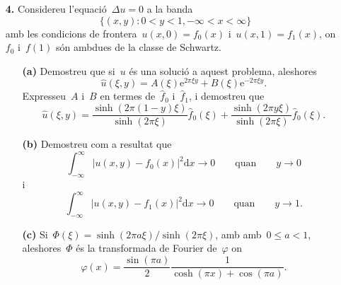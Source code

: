 \documentclass[a4paper]{article}
\theoremstyle{plain}
\theoremstyle{definition}
\newcommand{\e}{\mathrm{e}}
\providecommand{\uppi}{\pi}
\newcommand{\diff}{\mathrm{d}}
\newcommand{\abs}[1]{\lvert{#1}\rvert}
\begin{document}
\begin{enumerate}
    \item[\textbf{4.}] Considereu l'equació~\(\Delta u=0\) a la banda
        \[
            \{(x,y):0<y<1, -\infty<x<\infty\}
        \]
        amb les condicions de frontera~\(u(x,0)=f_{0}(x)\)
        i~\(u(x,1)=f_{1}(x)\), on~\(f_{0}\) i~\(f(1)\) són ambdues de la classe
        de Schwartz.
        \begin{enumerate}
            \item[\textbf{(a)}] Demostreu que si~\(u\) és una solució a aquest
                problema, aleshores
                \[
                    \widehat{u}(\xi,y) =
                    A(\xi)\e^{2\uppi\xi y}
                    +
                    B(\xi)\e^{-2\uppi\xi y}.
                \]
                Expresseu~\(A\) i~\(B\) en termes de~\(\widehat{f}_{0}\)
                i~\(\widehat{f}_{1}\), i demostreu que
                \[
                    \widehat{u}(\xi,y) =
                    \frac{\sinh(2\uppi(1-y)\xi)}{\sinh(2\uppi\xi)}
                    \widehat{f}_{0}(\xi)
                    +
                    \frac{\sinh(2\uppi y\xi)}{\sinh(2\uppi\xi)}
                    \widehat{f}_{0}(\xi).
                \]
        \end{enumerate}
\end{enumerate}

\begin{enumerate}
    \item[]\begin{enumerate}
        \item[\textbf{(b)}] Demostreu com a resultat que
            \[
                \int_{-\infty}^{\infty}
                \abs{u(x,y) - f_{0}(x)}^{2}
                \diff x
                \to 0
                \qquad\text{quan}\qquad
                y\to 0
            \]
            i
            \[
                \int_{-\infty}^{\infty}
                \abs{u(x,y) - f_{1}(x)}^{2}
                \diff x
                \to 0
                \qquad\text{quan}\qquad
                y\to 1.
            \]
    \end{enumerate}
\end{enumerate}

\begin{enumerate}
    \item[]\begin{enumerate}
        \item[\textbf{(c)}] Si~\(\Phi(\xi)=\sinh(2\uppi a\xi)/\sinh(2\uppi\xi)\), amb
            amb~\(0\leq a<1\), aleshores~\(\Phi\) és la transformada de Fourier
            de~\(\varphi\) on
            \[
                \varphi(x)
                = \frac{\sin(\uppi a)}{2}
                \frac{1}{\cosh(\uppi x) + \cos(\uppi a)}.
            \]
    \end{enumerate}
\end{enumerate}
\end{document}
